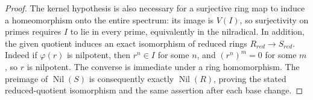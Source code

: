 \begin{proof}
The kernel hypothesis is also necessary
for a surjective ring map to induce a
homeomorphism onto the entire spectrum:
its image is $V(I)$, so surjectivity on
primes requires $I$ to lie in every
prime, equivalently in the nilradical.
In addition, the given quotient induces
an exact isomorphism of reduced rings
$R_{red}\to S_{red}$. Indeed if
$\varphi(r)$ is nilpotent, then $r^n\in I$
for some $n$, and $(r^n)^m=0$ for some
$m$, so $r$ is nilpotent. The converse
is immediate under a ring homomorphism.
The preimage of $\operatorname{Nil}(S)$
is consequently exactly
$\operatorname{Nil}(R)$, proving the
stated reduced-quotient isomorphism and
the same assertion after each base change.
\end{proof}